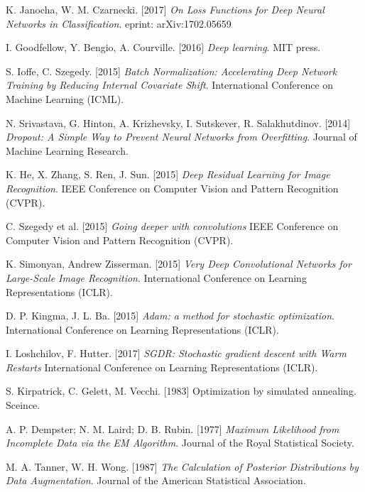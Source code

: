 \begin{thebibliography}{99}
     K. Janocha, W. M. Czarnecki. [2017]
     \textit{On Loss Functions for Deep Neural Networks in Classification}.
     eprint: arXiv:1702.05659
     	
     I. Goodfellow, Y. Bengio, A. Courville. [2016]
     \textit{Deep learning}.
     MIT press.

	 S. Ioffe, C. Szegedy. [2015]
	 \textit{Batch Normalization: Accelerating Deep Network Training by 
	 Reducing Internal Covariate Shift}. 
	 International Conference on Machine Learning (ICML).
	 
	 N. Srivastava, G. Hinton, A. Krizhevsky, I. Sutskever, R. Salakhutdinov. [2014]
	 \textit{Dropout: A Simple Way to Prevent Neural Networks from Overfitting}.
	 Journal of Machine Learning Research.
	 
	 K. He, X. Zhang, S. Ren, J. Sun. [2015]
	 \textit{Deep Residual Learning for Image Recognition}.
	 IEEE Conference on Computer Vision and Pattern Recognition (CVPR).
	 
	 C. Szegedy et al. [2015]
	 \textit{Going deeper with convolutions}
	 IEEE Conference on Computer Vision and Pattern Recognition (CVPR).
	 
	 K. Simonyan, Andrew Zisserman. [2015]
	 \textit{Very Deep Convolutional Networks for Large-Scale Image Recognition}.
	 International Conference on Learning Representations (ICLR).
	 
	 D. P. Kingma, J. L. Ba. [2015]
	 \textit{Adam: a method for stochastic optimization}.
	 International Conference on Learning Representations (ICLR).
	 
	 I. Loshchilov, F. Hutter. [2017]
	 \textit{SGDR: Stochastic gradient descent with Warm Restarts}
	 International Conference on Learning Representations (ICLR).
	 	 
	 S. Kirpatrick, C. Gelett, M. Vecchi. [1983]
	 Optimization by simulated annealing.
	 Sceince.
	 
	A. P. Dempster; N. M. Laird; D. B. Rubin. [1977]
	\textit{Maximum Likelihood from Incomplete Data via the EM Algorithm}.
	Journal of the Royal Statistical Society.
	 
	M. A. Tanner, W. H. Wong. [1987]
	\textit{The Calculation of Posterior Distributions by Data Augmentation}.
	Journal of the American Statistical Association.
	
\end{thebibliography}
